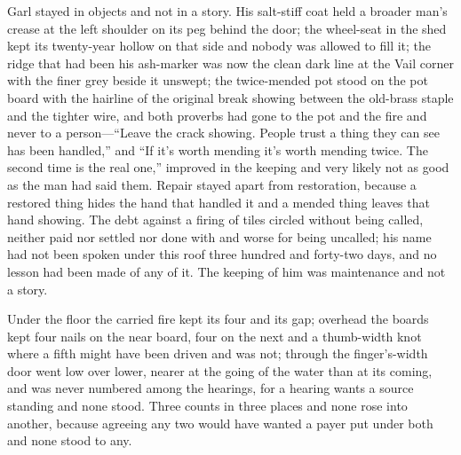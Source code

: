 Garl stayed in objects and not in a story. His salt-stiff coat held a broader man's crease at the left shoulder on its peg behind the door; the wheel-seat in the shed kept its twenty-year hollow on that side and nobody was allowed to fill it; the ridge that had been his ash-marker was now the clean dark line at the Vail corner with the finer grey beside it unswept; the twice-mended pot stood on the pot board with the hairline of the original break showing between the old-brass staple and the tighter wire, and both proverbs had gone to the pot and the fire and never to a person---“Leave the crack showing. People trust a thing they can see has been handled,” and “If it's worth mending it's worth mending twice. The second time is the real one,” improved in the keeping and very likely not as good as the man had said them. Repair stayed apart from restoration, because a restored thing hides the hand that handled it and a mended thing leaves that hand showing. The debt against a firing of tiles circled without being called, neither paid nor settled nor done with and worse for being uncalled; his name had not been spoken under this roof three hundred and forty-two days, and no lesson had been made of any of it. The keeping of him was maintenance and not a story.

\scenebreak

Under the floor the carried fire kept its four and its gap; overhead the boards kept four nails on the near board, four on the next and a thumb-width knot where a fifth might have been driven and was not; through the finger's-width door  went low over lower, nearer at the going of the water than at its coming, and was never numbered among the hearings, for a hearing wants a source standing and none stood. Three counts in three places and none rose into another, because agreeing any two would have wanted a payer put under both and none stood to any.


